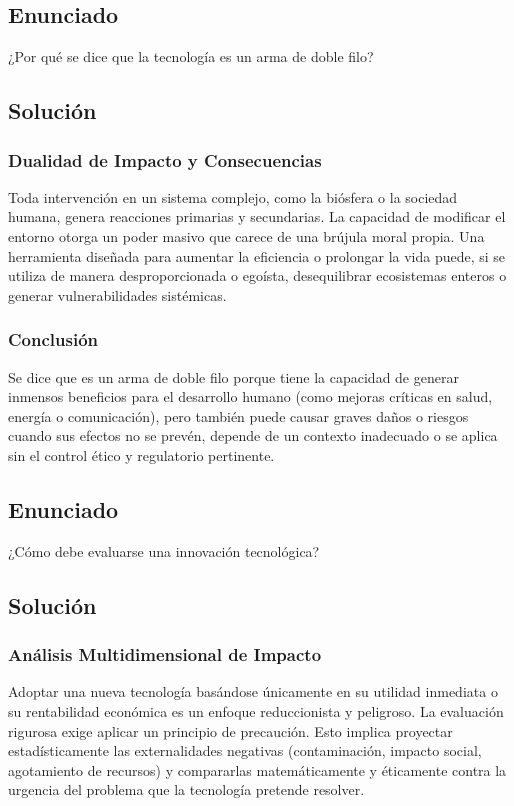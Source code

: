 \documentclass[12pt, a4paper]{article}
\begin{document}
\newpage

\subsection*{Enunciado}
¿Por qué se dice que la tecnología es un arma de doble filo?

\subsection*{Solución}

\subsubsection*{Dualidad de Impacto y Consecuencias}
Toda intervención en un sistema complejo, como la biósfera o la sociedad humana, genera reacciones primarias y secundarias. La capacidad de modificar el entorno otorga un poder masivo que carece de una brújula moral propia. Una herramienta diseñada para aumentar la eficiencia o prolongar la vida puede, si se utiliza de manera desproporcionada o egoísta, desequilibrar ecosistemas enteros o generar vulnerabilidades sistémicas.

\subsubsection*{Conclusión}
Se dice que es un arma de doble filo porque tiene la capacidad de generar inmensos beneficios para el desarrollo humano (como mejoras críticas en salud, energía o comunicación), pero también puede causar graves daños o riesgos cuando sus efectos no se prevén, depende de un contexto inadecuado o se aplica sin el control ético y regulatorio pertinente.

\newpage

\subsection*{Enunciado}
¿Cómo debe evaluarse una innovación tecnológica?

\subsection*{Solución}

\subsubsection*{Análisis Multidimensional de Impacto}
Adoptar una nueva tecnología basándose únicamente en su utilidad inmediata o su rentabilidad económica es un enfoque reduccionista y peligroso. La evaluación rigurosa exige aplicar un principio de precaución. Esto implica proyectar estadísticamente las externalidades negativas (contaminación, impacto social, agotamiento de recursos) y compararlas matemáticamente y éticamente contra la urgencia del problema que la tecnología pretende resolver.
\end{document}
